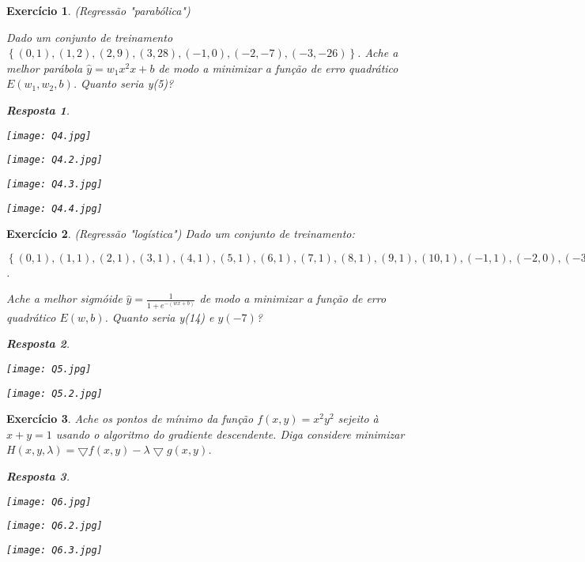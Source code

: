 \documentclass{article}
\newtheorem{ex}{Exercício}
\newtheorem{resp}{Resposta}
\begin{document}
\begin{ex}
    (Regressão "parabólica")  
\item Dado um conjunto de treinamento $\left\{(0,1),(1,2),(2,9),(3,28), (-1,0),(-2,-7),(-3,-26)\right\}$. Ache a melhor parábola $\hat{y}=w_1x^2x+b$ de modo a minimizar a função de erro quadrático $E(w_1,w_2,b)$. Quanto seria y(5)?
\begin{resp}
\end{resp}
\begin{center}
\texttt{[image: Q4.jpg]}
\end{center}
\begin{center}
\texttt{[image: Q4.2.jpg]}
\end{center}
\begin{center}
\texttt{[image: Q4.3.jpg]}
\end{center}
\begin{center}
\texttt{[image: Q4.4.jpg]}
\end{center}
\end{ex}

\begin{ex}
    (Regressão "logística") Dado um conjunto de treinamento:
\item  $\left\{(0,1),(1,1),(2,1),(3,1), (4,1),(5,1),(6,1),(7,1),(8,1),(9,1),(10,1),(-1,1),(-2,0),(-3,0),(-4,0),(-5,0)\right\}$. 
\item Ache a melhor sigmóide $\hat{y}=\frac{1}{1+e^{-(wx+b)}}$ de modo a minimizar a função de erro quadrático $E(w,b)$. Quanto seria y(14) e $y(-7)$?
\begin{resp}
\end{resp}
\begin{center}
\texttt{[image: Q5.jpg]}
\end{center}
\begin{center}
\texttt{[image: Q5.2.jpg]}
\end{center}
\end{ex}

\begin{ex}
    Ache os pontos de mínimo da função $f(x,y)=x^2y^2$ sejeito à $x+y=1$ usando o algoritmo do gradiente descendente. Diga considere minimizar $H(x,y,\lambda)=	\bigtriangledown f(x,y)-\lambda	\bigtriangledown g(x,y)$.
\begin{resp}
\end{resp}
\begin{center}
\texttt{[image: Q6.jpg]}
\end{center}
\begin{center}
\texttt{[image: Q6.2.jpg]}
\end{center}
\begin{center}
\texttt{[image: Q6.3.jpg]}
\end{center}
\end{ex}
\end{document}
